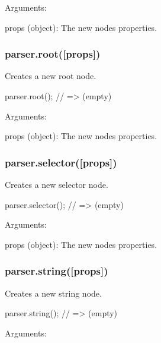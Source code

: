 Arguments\+:


\begin{DoxyItemize}
\item {\ttfamily props (object)}\+: The new node\textquotesingle{}s properties.
\end{DoxyItemize}

\subsubsection*{{\ttfamily parser.\+root(\mbox{[}props\mbox{]})}}

Creates a new root node.


\begin{DoxyCode}
parser.root();
// => (empty)
\end{DoxyCode}


Arguments\+:


\begin{DoxyItemize}
\item {\ttfamily props (object)}\+: The new node\textquotesingle{}s properties.
\end{DoxyItemize}

\subsubsection*{{\ttfamily parser.\+selector(\mbox{[}props\mbox{]})}}

Creates a new selector node.


\begin{DoxyCode}
parser.selector();
// => (empty)
\end{DoxyCode}


Arguments\+:


\begin{DoxyItemize}
\item {\ttfamily props (object)}\+: The new node\textquotesingle{}s properties.
\end{DoxyItemize}

\subsubsection*{{\ttfamily parser.\+string(\mbox{[}props\mbox{]})}}

Creates a new string node.


\begin{DoxyCode}
parser.string();
// => (empty)
\end{DoxyCode}


Arguments\+:


